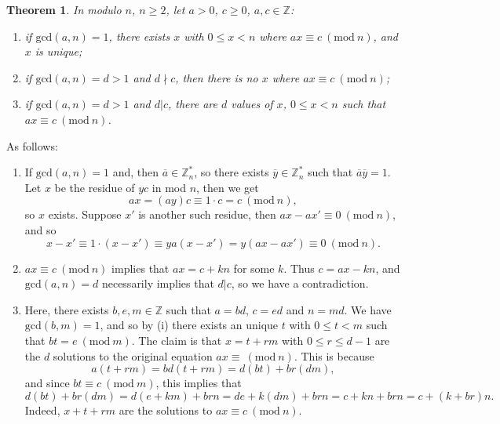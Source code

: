 \documentclass[letter-paper]{tufte-book}
\newtheorem{theorem}{\color{pastel-blue}Theorem}[section]
\newenvironment{proof}[1][Proof]{\begin{trivlist}
\item[\hskip \labelsep {\bfseries #1}]}{\end{trivlist}}
\begin{document}
\begin{theorem}
  In modulo $n$, $n\geq2$, let $a>0$, $c\geq0$, $a,c\in\mathbb{Z}$:
  \begin{enumerate}
    \item if $\mbox{gcd}(a,n)=1$, there exists $x$ with $0\leq x<n$ where
    $ax\equiv c\ (\mbox{mod}\ n)$, and $x$ is unique;
    \item if $\mbox{gcd}(a,n)=d>1$ and $d\nmid c$, then there is no $x$ where
    $ax\equiv c\ (\mbox{mod}\ n)$;
    \item if $\mbox{gcd}(a,n)=d>1$ and $d|c$, there are $d$ values of $x$,
    $0\leq x<n$ such that $ax\equiv c\ (\mbox{mod}\ n)$.
  \end{enumerate}
\end{theorem}
\begin{proof}
  As follows:
  \begin{enumerate}
    \item If $\mbox{gcd}(a,n)=1$ and, then $\overline{a}\in\mathbb{Z}_n^*$, so
    there exists $\overline{y}\in\mathbb{Z}_n^*$ such that
    $\overline{a}\overline{y}=1$. Let $x$ be the residue of $yc$ in mod $n$,
    then we get
    \begin{equation*}
      ax=(ay)c\equiv1\cdot c=c\ (\mbox{mod}\ n),
    \end{equation*}
    so $x$ exists. Suppose $x'$ is another such residue, then $ax-ax'\equiv0\
    (\mbox{mod}\ n)$, and so
    \begin{equation*}
      x-x'\equiv1\cdot(x-x')\equiv ya(x-x')=y(ax-ax')\equiv0\ (\mbox{mod}\ n).
    \end{equation*}
    \item $ax\equiv c\ (\mbox{mod}\ n)$ implies that $ax=c+kn$ for some $k$.
    Thus $c=ax-kn$, and $\mbox{gcd}(a,n)=d$ necessarily implies that $d|c$, so
    we have a contradiction.
    \item Here, there exists $b,e,m\in\mathbb{Z}$ such that $a=bd$, $c=ed$ and
    $n=md$. We have $\mbox{gcd}(b,m)=1$, and so by (i) there exists an unique
    $t$ with $0\leq t<m$ such that $bt=e\ (\mbox{mod}\ m)$. The claim is that
    $x=t+rm$ with $0\leq r\leq d-1$ are the $d$ solutions to the original
    equation $ax\equiv\ (\mbox{mod}\ n)$. This is because
    \begin{equation*}
      a(t+rm)=bd(t+rm)=d(bt)+br(dm),
    \end{equation*}
    and since $bt\equiv c\ (\mbox{mod}\ m)$, this implies that
    \begin{equation*}
      d(bt)+br(dm)=d(e+km)+brn=de+k(dm)+brn=c+kn+brn=c+(k+br)n.
    \end{equation*}
    Indeed, $x+t+rm$ are the solutions to $ax\equiv c\ (\mbox{mod}\ n)$.
    

\end{enumerate}
\end{proof}
\end{document}
